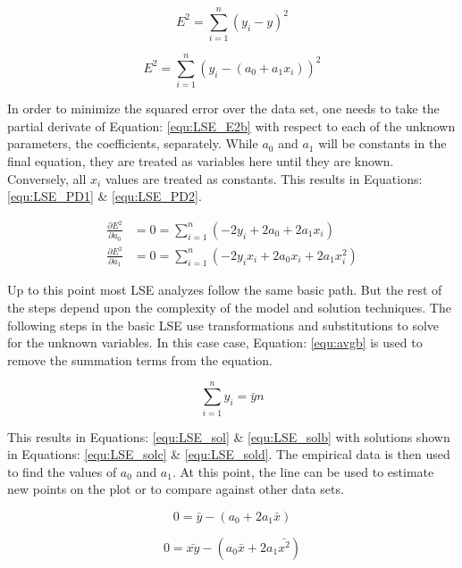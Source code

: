 \begin{equation}
    \label{equ:LSE_E2}
    E^2 = \sum_{i=1}^{n} (y_i - y)^2
\end{equation}

\begin{equation}
    \label{equ:LSE_E2b}
    E^2 = \sum_{i=1}^{n} (y_i - (a_0 + a_1 x_i))^2
\end{equation}

In order to minimize the squared error over the data set, one needs to take the partial derivate of Equation: \eqref{equ:LSE_E2b} with respect to each of the unknown parameters, the coefficients, separately. While $a_0$ and $a_1$ will be constants in the final equation, they are treated as variables here until they are known. Conversely, all $x_i$ values are treated as constants. This results in Equations: \eqref{equ:LSE_PD1} \& \eqref{equ:LSE_PD2}.

\begin{align} 
    \frac{\partial E^2}{\partial a_0} &= 0 = \sum_{i=1}^{n} (-2y_i +2a_0 + 2a_1 x_i)           \label{equ:LSE_PD1} \\
    \frac{\partial E^2}{\partial a_1} &= 0 = \sum_{i=1}^{n} (-2y_i x_i +2a_0 x_i + 2a_1 x_i^2) \label{equ:LSE_PD2}
\end{align}

Up to this point most LSE analyzes follow the same basic path. But the rest of the steps depend upon the complexity of the model and solution techniques. The following steps in the basic LSE use transformations and substitutions to solve for the unknown variables. In this case case, Equation: \eqref{equ:avgb} is used to remove the summation terms from the equation.

\begin{equation}
    \label{equ:avgb} 
    \sum_{i=1}^{n} y_i  = \bar{y}n
\end{equation}

This results in Equations: \eqref{equ:LSE_sol} \& \eqref{equ:LSE_solb} with solutions shown in Equations: \eqref{equ:LSE_solc} \& \eqref{equ:LSE_sold}. The empirical data is then used to find the values of $a_0$ and $a_1$. At this point, the line can be used to estimate new points on the plot or to compare against other data sets.

\begin{equation}
    \label{equ:LSE_sol}
    0 = \bar{y} - (a_0 + 2a_1 \bar{x})
\end{equation}

\begin{equation}
    \label{equ:LSE_solb}
    0 = \bar{xy} - (a_0 \bar{x} + 2a_1 \bar{x^2})
\end{equation}


